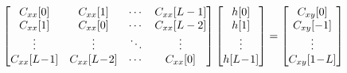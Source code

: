 \documentclass[preview]{standalone}
\begin{document}
\begin{align*}
\special{dvisvgm:raw <g id='unique000'>}\begin{bmatrix} C_{xx}[0] & C_{xx}[1] & \cdots & C_{xx}[L-1]\\C_{xx}[1] & C_{xx}[0] & \cdots & C_{xx}[L-2]\\\vdots & \vdots & \ddots & \vdots\\C_{xx}[L\!-\!1] & C_{xx}[L\!-\!2] & \cdots & C_{xx}[0]\end{bmatrix}\begin{bmatrix} h[0]\\ h[1]\\ \vdots\\ h[L\!-\!1]\end{bmatrix}=\begin{bmatrix} C_{xy}[0]\\ C_{xy}[-1]\\ \vdots\\ C_{xy}[1\!-\!L]\end{bmatrix}\special{dvisvgm:raw </g>}
\end{align*}
\end{document}
